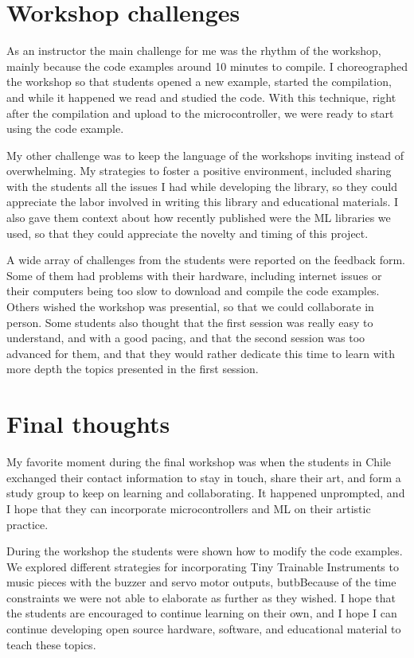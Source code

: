 \section{Workshop challenges}

As an instructor the main challenge for me was the rhythm of the workshop, mainly because the code examples around 10 minutes to compile. I choreographed the workshop so that students opened a new example, started the compilation, and while it happened we read and studied the code. With this technique, right after the compilation and upload to the microcontroller, we were ready to start using the code example.

My other challenge was to keep the language of the workshops inviting instead of overwhelming. My strategies to foster a positive environment, included sharing  with the students all the issues I had while developing the library, so they could appreciate the labor involved in writing this library and educational materials. I also gave them context about how recently published were the \acrshort{ML} libraries we used, so that they could appreciate the novelty and timing of this project.

A wide array of challenges from the students were reported on the feedback form. Some of them had problems with their hardware, including internet issues or their computers being too slow to download and compile the code examples. Others wished the workshop was presential, so that we could collaborate in person. Some students also thought that the first session was really easy to understand, and with a good pacing, and that the second session was too advanced for them, and that they would rather dedicate this time to learn with more depth the topics presented in the first session.

\section{Final thoughts}

My favorite moment during the final workshop was when the students in Chile exchanged their contact information to stay in touch, share their art, and form a study group to keep on learning and collaborating. It happened unprompted, and I hope that they can incorporate microcontrollers and \acrshort{ML} on their artistic practice.

During the workshop the students were shown how to modify the code examples. We explored different strategies for incorporating Tiny Trainable Instruments to music pieces with the buzzer and servo motor outputs, butbBecause of the time constraints we were not able to elaborate as further as they wished. I hope that the students are encouraged to continue learning on their own, and I hope I can continue developing open source hardware, software, and educational material to teach these topics.
